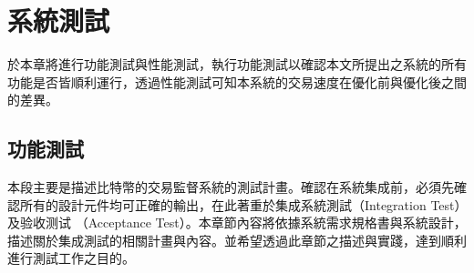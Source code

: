 \chapter{系統測試}
於本章將進行功能測試與性能測試，執行功能測試以確認本文所提出之系統的所有功能是否皆順利運行，透過性能測試可知本系統的交易速度在優化前與優化後之間的差異。
	\section{功能測試}
	 	本段主要是描述比特幣的交易監督系統的測試計畫。確認在系統集成前，必須先確認所有的設計元件均可正確的輸出，在此著重於集成系統測試（Integration Test）及验收测试 （Acceptance Test）。本章節內容將依據系統需求規格書與系統設計，描述關於集成測試的相關計畫與內容。並希望透過此章節之描述與實踐，達到順利進行測試工作之目的。
